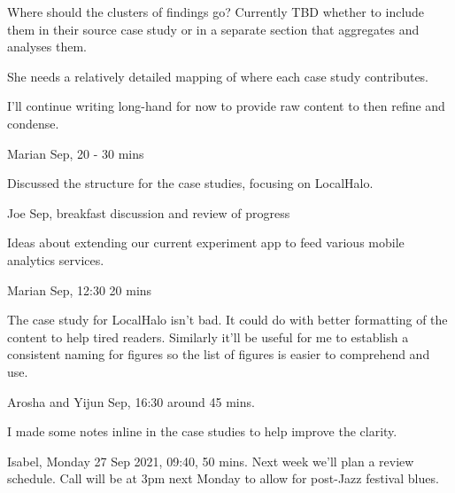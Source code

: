 Where should the clusters of findings go?
Currently TBD whether to include them in their source case study or in a separate section that aggregates and analyses them.

She needs a relatively detailed mapping of where each case study contributes.

I'll continue writing long-hand for now to provide raw content to then refine and condense.

\dotfill
Marian  Sep, 20 - 30 mins

Discussed the structure for the case studies, focusing on LocalHalo.

\dotfill
Joe  Sep, breakfast discussion and review of progress

Ideas about extending our current experiment app to feed various mobile analytics services. 

\dotfill
Marian  Sep, 12:30 20 mins

The case study for LocalHalo isn't bad. It could do with better formatting of the content to help tired readers. Similarly it'll be useful for me to establish a consistent naming for figures so the list of figures is easier to comprehend and use.

\dotfill
Arosha and Yijun  Sep, 16:30 around 45 mins.

I made some notes inline in the case studies to help improve the clarity.

\dotfill
Isabel, Monday 27 Sep 2021, 09:40, 50 mins.
Next week we'll plan a review schedule. Call will be at 3pm next Monday to allow for post-Jazz festival blues.

\dotfill



